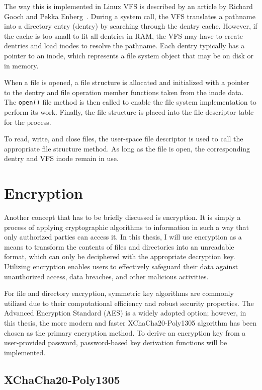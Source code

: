 The way this is implemented in Linux VFS is described by an article by Richard Gooch and Pekka Enberg~\cite{vfs}.
During a system call, the VFS translates a pathname into a directory entry (dentry) by searching through the dentry cache.
However, if the cache is too small to fit all dentries in RAM, the VFS may have to create dentries and load inodes to resolve the pathname.
Each dentry typically has a pointer to an inode, which represents a file system object that may be on disk or in memory.

When a file is opened, a file structure is allocated and initialized with a pointer to the dentry and file operation member functions taken from the inode data.
The \texttt{open()} file method is then called to enable the file system implementation to perform its work.
Finally, the file structure is placed into the file descriptor table for the process.

To read, write, and close files, the user-space file descriptor is used to call the appropriate file structure method.
As long as the file is open, the corresponding dentry and VFS inode remain in use.


\section{Encryption}\label{sec:encryption-approaches}

Another concept that has to be briefly discussed is encryption.
It is simply a process of applying cryptographic algorithms to information in such a way that only authorized parties can access it.
In this thesis, I will use encryption as a means to transform the contents of files and directories into an unreadable format, which can only be deciphered with the appropriate decryption key.
Utilizing encryption enables users to effectively safeguard their data against unauthorized access, data breaches, and other malicious activities.

For file and directory encryption, symmetric key algorithms are commonly utilized due to their computational efficiency and robust security properties.
The Advanced Encryption Standard (AES) is a widely adopted option; however, in this thesis, the more modern and faster XChaCha20-Poly1305 algorithm has been chosen as the primary encryption method.
To derive an encryption key from a user-provided password, password-based key derivation functions will be implemented.

\subsection{XChaCha20-Poly1305}\label{subsec:xchacha20-poly1305}

